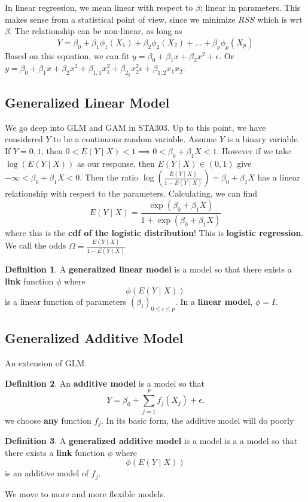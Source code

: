 \documentclass[12pt, a4paper]{article}
\theoremstyle{definition}
\newtheorem{definition}{Definition}
\newcommand{\imp}{\implies}
\newcommand{\eps}{\epsilon}
\newcommand{\f}{\frac}
\newcommand{\BB}[1]{\left(#1\right)}
\begin{document}
	In linear regression, we mean linear with respect to $\beta$: linear in parameters. This makes sense from a statistical point of view, since we minimize $RSS$ which is wrt $\beta$. The relationship can be non-linear, as long as
	$$
		Y = \beta_0 + \beta_1 \phi_1(X_1) + \beta_2 \phi_2(X_2) + \ldots + \beta_p\phi_p(X_p)
	$$
	Based on this equation, we can fit $y = \beta_0 + \beta_1 x + \beta_2 x^2 + \eps$. Or $y = \beta_0 + \beta_1 x + \beta_2 x^2 + \beta_{1,1} x_1^2 + \beta_{2_2} x_2^2 \eps + \beta_{1,2} x_1x_2$.
	
	\subsection{Generalized Linear Model}
	
	We go deep into GLM and GAM in STA303. Up to this point, we have considered $Y$ to be a continuous random variable.	Assume $Y$ is a binary variable. If $Y = 0,1$, then $0<E(Y \mid X) < 1 \imp 0 < \beta_0 + \beta_1 X < 1$. However if we take $\log(E(Y \mid X))$ as our response, then $E(Y\mid X) \in (0,1)$ give $-\infty < \beta_0 + \beta_1 X < 0$. Then the ratio $\log \BB{\f{E(Y\mid X)}{1 - E(Y \mid X)}} = \beta_0 + \beta_1 X$ has a linear relationship with respect to the parameters. Calculating, we can find
	$$
		E(Y \mid X) = \f{\exp(\beta_0 + \beta_1 X)}{1 + \exp(\beta_0 + \beta_1X)}
	$$
	where this is the {\bf cdf of the logistic distribution}! This is {\bf logistic regression}.
	We call the odds $\Omega = \f{E(Y\mid X)}{1 - E(Y \mid X)}$
	\begin{definition}
		A {\bf generalized linear model} is a model so that there exists a {\bf link} function $\phi$ where $$\phi(E(Y \mid X))$$ is a linear function of parameters $(\beta_i)_{0 \leq i \leq p}$. In a {\bf linear model}, $\phi = I$. 
	\end{definition}
		
	\subsection{Generalized Additive Model}
	
	An extension of GLM. 
	\begin{definition}
		An {\bf additive model} is a model so that 
		$$
			Y = \beta_0 + \sum_{j=1}^p f_j(X_j) + \eps.
		$$
		we choose {\bf any} function $f_j$. In its basic form, the additive model will do poorly
	\end{definition}

	\begin{definition}
		A {\bf generalized additive model} is a model is a a model so that there exists a {\bf link} function $\phi$ where $$\phi(E(Y \mid X))$$ is an additive model of $f_j$.
	\end{definition}

	We move to more and more flexible models.

	
		
		
		
			
	
		
		
\end{document}
